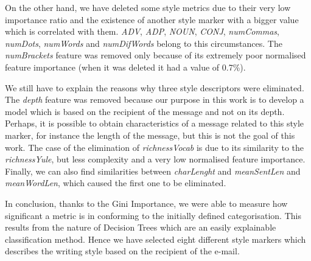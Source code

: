 On the other hand, we have deleted some style metrics due to their very low importance ratio and the existence of another style marker with a bigger value which is correlated with them. \textit{ADV}, \textit{ADP}, \textit{NOUN}, \textit{CONJ}, \textit{numCommas}, \textit{numDots}, \textit{numWords} and \textit{numDifWords} belong to this circumstances. The \textit{numBrackets} feature was removed only because of its extremely poor normalised feature importance (when it was deleted it had a value of 0.7\%).

We still have to explain the reasons why three style descriptors were eliminated. The \textit{depth} feature was removed because our purpose in this work is to develop a model which is based on the recipient of the message and not on its depth. Perhaps, it is possible to obtain characteristics of a message related to this style marker, for instance the length of the message, but this is not the goal of this work. The case of the elimination of \textit{richnessVocab} is due to its similarity to the \textit{richnessYule}, but less complexity and a very low normalised feature importance. Finally, we can also find similarities between \textit{charLenght} and \textit{meanSentLen} and \textit{meanWordLen}, which caused the first one to be eliminated.

In conclusion, thanks to the Gini Importance, we were able to measure how significant a metric is in conforming to the initially defined categorisation. This results from the nature of Decision Trees which are an easily explainable classification method. Hence we have selected eight different style markers which describes the writing style based on the recipient of the e-mail.